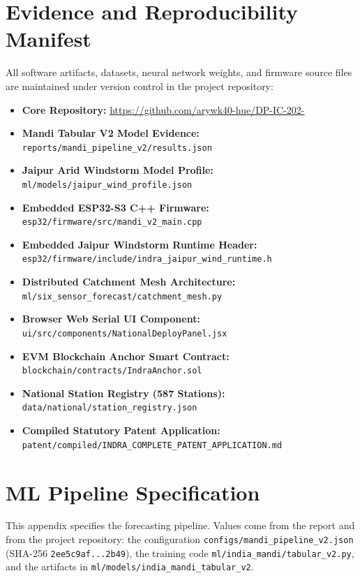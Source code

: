 \documentclass[journal,a4paper]{IEEEtran}
\begin{document}
\section{Evidence and Reproducibility Manifest}

All software artifacts, datasets, neural network weights, and firmware source files are maintained under version control in the project repository:
\begin{itemize}
  \item \textbf{Core Repository:} \url{https://github.com/arywk40-hue/DP-IC-202-}
  \item \textbf{Mandi Tabular V2 Model Evidence:} \nolinkurl{reports/mandi_pipeline_v2/results.json}
  \item \textbf{Jaipur Arid Windstorm Model Profile:} \nolinkurl{ml/models/jaipur_wind_profile.json}
  \item \textbf{Embedded ESP32-S3 C++ Firmware:} \nolinkurl{esp32/firmware/src/mandi_v2_main.cpp}
  \item \textbf{Embedded Jaipur Windstorm Runtime Header:} \nolinkurl{esp32/firmware/include/indra_jaipur_wind_runtime.h}
  \item \textbf{Distributed Catchment Mesh Architecture:} \nolinkurl{ml/six_sensor_forecast/catchment_mesh.py}
  \item \textbf{Browser Web Serial UI Component:} \nolinkurl{ui/src/components/NationalDeployPanel.jsx}
  \item \textbf{EVM Blockchain Anchor Smart Contract:} \nolinkurl{blockchain/contracts/IndraAnchor.sol}
  \item \textbf{National Station Registry (587 Stations):} \nolinkurl{data/national/station_registry.json}
  \item \textbf{Compiled Statutory Patent Application:} \nolinkurl{patent/compiled/INDRA_COMPLETE_PATENT_APPLICATION.md}
\end{itemize}

\appendices
\section{ML Pipeline Specification}

This appendix specifies the forecasting pipeline. Values come from the report and from the project repository: the configuration \nolinkurl{configs/mandi_pipeline_v2.json} (SHA-256 \texttt{2ee5c9af...2b49}), the training code \nolinkurl{ml/india_mandi/tabular_v2.py}, and the artifacts in \nolinkurl{ml/models/india_mandi_tabular_v2}.
\end{document}
